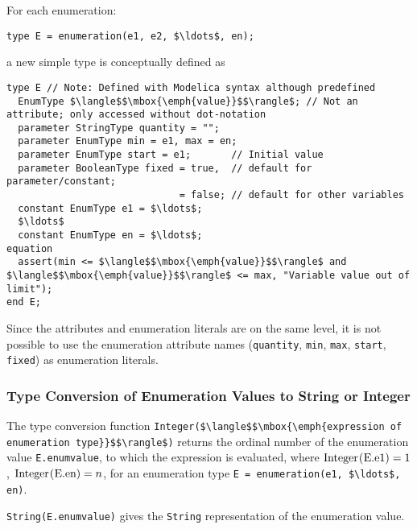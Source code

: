 For each enumeration:
\begin{lstlisting}[language=modelica]
type E = enumeration(e1, e2, $\ldots$, en);
\end{lstlisting}
a new simple type is conceptually defined as
\begin{lstlisting}[language=modelica]
type E // Note: Defined with Modelica syntax although predefined
  EnumType $\langle$$\mbox{\emph{value}}$$\rangle$; // Not an attribute; only accessed without dot-notation
  parameter StringType quantity = "";
  parameter EnumType min = e1, max = en;
  parameter EnumType start = e1;       // Initial value
  parameter BooleanType fixed = true,  // default for parameter/constant;
                              = false; // default for other variables
  constant EnumType e1 = $\ldots$;
  $\ldots$
  constant EnumType en = $\ldots$;
equation
  assert(min <= $\langle$$\mbox{\emph{value}}$$\rangle$ and $\langle$$\mbox{\emph{value}}$$\rangle$ <= max, "Variable value out of limit");
end E;
\end{lstlisting}

\begin{nonnormative}
Since the attributes and enumeration literals are on the same
level, it is not possible to use the enumeration attribute names
(\lstinline!quantity!, \lstinline!min!, \lstinline!max!, \lstinline!start!, \lstinline!fixed!) as enumeration literals.
\end{nonnormative}

\subsubsection{Type Conversion of Enumeration Values to String or Integer}\label{type-conversion-of-enumeration-values-to-string-or-integer}

The type conversion function \lstinline!Integer($\langle$$\mbox{\emph{expression of enumeration type}}$$\rangle$)! returns the ordinal number of the enumeration value \lstinline!E.enumvalue!, to which the expression is evaluated, where $\text{\lstinline!Integer(E.e1)!} = 1$, $\text{\lstinline!Integer(E.en)!} = n$, for an enumeration type \lstinline!E = enumeration(e1, $\ldots$, en)!.

\lstinline!String(E.enumvalue)! gives the \lstinline!String! representation of the enumeration value.

